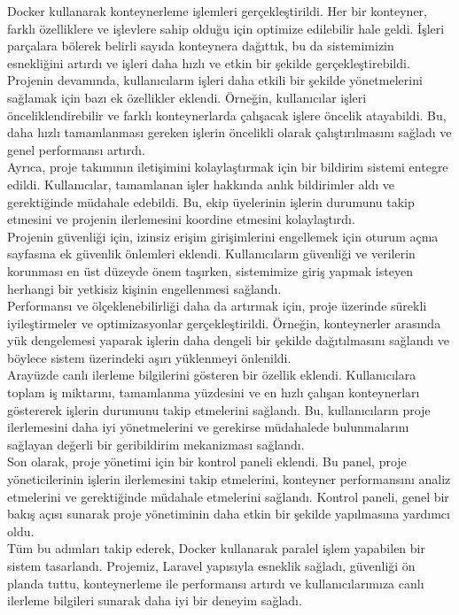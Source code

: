 Docker kullanarak konteynerleme işlemleri gerçekleştirildi. Her bir konteyner, farklı özelliklere ve işlevlere sahip olduğu için optimize edilebilir hale geldi. İşleri parçalara bölerek belirli sayıda konteynera dağıttık, bu da sistemimizin esnekliğini artırdı ve işleri daha hızlı ve etkin bir şekilde gerçekleştirebildi.\\
Projenin devamında, kullanıcıların işleri daha etkili bir şekilde yönetmelerini sağlamak için bazı ek özellikler eklendi. Örneğin, kullanıcılar işleri önceliklendirebilir ve farklı konteynerlarda çalışacak işlere öncelik atayabildi. Bu, daha hızlı tamamlanması gereken işlerin öncelikli olarak çalıştırılmasını sağladı ve genel performansı artırdı.\\
Ayrıca, proje takımının iletişimini kolaylaştırmak için bir bildirim sistemi entegre edildi. Kullanıcılar, tamamlanan işler hakkında anlık bildirimler aldı ve gerektiğinde müdahale edebildi. Bu, ekip üyelerinin işlerin durumunu takip etmesini ve projenin ilerlemesini koordine etmesini kolaylaştırdı.\\
Projenin güvenliği için, izinsiz erişim girişimlerini engellemek için oturum açma sayfasına ek güvenlik önlemleri eklendi. Kullanıcıların güvenliği ve verilerin korunması en üst düzeyde önem taşırken, sistemimize giriş yapmak isteyen herhangi bir yetkisiz kişinin engellenmesi sağlandı.\\
Performansı ve ölçeklenebilirliği daha da artırmak için, proje üzerinde sürekli iyileştirmeler ve optimizasyonlar gerçekleştirildi. Örneğin, konteynerler arasında yük dengelemesi yaparak işlerin daha dengeli bir şekilde dağıtılmasını sağlandı ve böylece sistem üzerindeki aşırı yüklenmeyi önlenildi.\\
Arayüzde canlı ilerleme bilgilerini gösteren bir özellik eklendi. Kullanıcılara toplam iş miktarını, tamamlanma yüzdesini ve en hızlı çalışan konteynerları göstererek işlerin durumunu takip etmelerini sağlandı. Bu, kullanıcıların proje ilerlemesini daha iyi yönetmelerini ve gerekirse müdahalede bulunmalarını sağlayan değerli bir geribildirim mekanizması sağlandı.\\
Son olarak, proje yönetimi için bir kontrol paneli eklendi. Bu panel, proje yöneticilerinin işlerin ilerlemesini takip etmelerini, konteyner performansını analiz etmelerini ve gerektiğinde müdahale etmelerini sağlandı. Kontrol paneli, genel bir bakış açısı sunarak proje yönetiminin daha etkin bir şekilde yapılmasına yardımcı oldu.\\
Tüm bu adımları takip ederek, Docker kullanarak paralel işlem yapabilen bir sistem tasarlandı. Projemiz, Laravel  yapısıyla esneklik sağladı, güvenliği ön planda tuttu, konteynerleme ile performansı artırdı ve kullanıcılarımıza canlı ilerleme bilgileri sunarak daha iyi bir deneyim sağladı.\\


